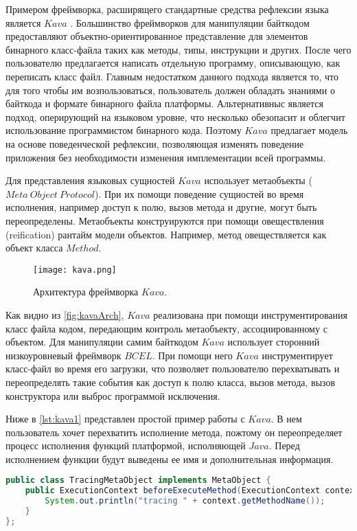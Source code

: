 Примером фреймворка, расширящего стандартные средства рефлексии языка является $Kava$ \cite{kava1} \cite{kava2}. Большинство фреймворков для манипуляции байткодом предоставляют объектно-ориентированное представление для элементов бинарного класс-файла таких как методы, типы, инструкции и других. После чего пользователю предлагается написать отдельную программу, описывающую, как переписать класс файл. Главным недостатком данного подхода является то, что для того чтобы им возпользоваться, пользователь должен обладать знаниями о байткода и формате бинарного файла платформы. Альтернативныс является подход, оперирующий на языковом уровне, что несколько обезопасит и облегчит использование программистом бинарного кода. Поэтому $Kava$ предлагает модель на основе поведенческой рефлексии, позволяющая изменять поведение приложения без необходимости изменения имплементации всей программы.

Для представления языковых сущностей $Kava$ использует метаобъекты ($Meta~Object~Protocol$). При их помощи поведение сущностей во время исполнения, например доступ к полю, вызов метода и другие, могут быть переопределены. Метаобъекты конструируются при помощи овеществления (reification) рантайм модели объектов. Например, метод овеществляется как объект класса $Method$.

\begin{figure}[h]
\centering
\texttt{[image: kava.png]}
\caption{Архитектура фреймворка $Kava$.}
\label{fig:kavaArch}
\end{figure}

Как видно из \autoref{fig:kavaArch}, $Kava$ реализована при помощи инструментирования класс файла кодом, передающим контроль метаобъекту, ассоциированному с объектом. Для манипуляции самим байткодом $Kava$ использует сторонний низкоуровневый фреймворк $BCEL$. При помощи него $Kava$ инструментирует класс-файл во время его загрузки, что позволяет пользователю перехватывать и переопределять такие события как доступ к полю класса, вызов метода, вызов конструктора или выброс программой исключения.

Ниже в \autoref{lst:kava1} представлен простой пример работы с $Kava$. В нем пользователь хочет перехватить исполнение метода, пожтому он переопределяет процесс исполнения функций платформой, исполняющей $Java$. Перед исполнением функции будут выведены ее имя и дополнительная информация.

\begin{lstlisting}[language=Java, caption=Объявление метаобъекта в $Kava$, label=lst:kava1]
public class TracingMetaObject implements MetaObject {
    public ExecutionContext beforeExecuteMethod(ExecutionContext context) {
        System.out.println("tracing " + context.getMethodName());
    }
};
\end{lstlisting}

